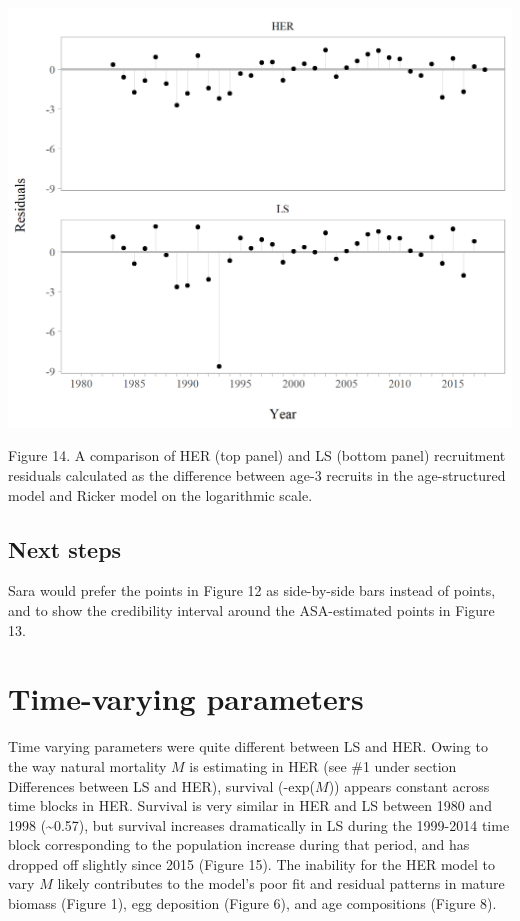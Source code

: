 \documentclass[]{article}
\begin{document}
\includegraphics[width=1\linewidth]{../../HER/figs/compare_recruitresids}

Figure 14. A comparison of HER (top panel) and LS (bottom panel)
recruitment residuals calculated as the difference between age-3
recruits in the age-structured model and Ricker model on the logarithmic
scale.

\subsection{Next steps}\label{next-steps}

Sara would prefer the points in Figure 12 as side-by-side bars instead
of points, and to show the credibility interval around the ASA-estimated
points in Figure 13.

\section{Time-varying parameters}\label{time-varying-parameters}

Time varying parameters were quite different between LS and HER. Owing
to the way natural mortality \(M\) is estimating in HER (see \#1 under
section Differences between LS and HER), survival (-exp(\(M\))) appears
constant across time blocks in HER. Survival is very similar in HER and
LS between 1980 and 1998 (\textasciitilde{}0.57), but survival increases
dramatically in LS during the 1999-2014 time block corresponding to the
population increase during that period, and has dropped off slightly
since 2015 (Figure 15). The inability for the HER model to vary \(M\)
likely contributes to the model's poor fit and residual patterns in
mature biomass (Figure 1), egg deposition (Figure 6), and age
compositions (Figure 8).
\end{document}
